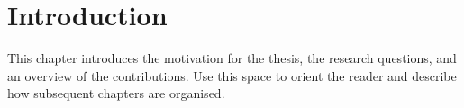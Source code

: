 \chapter{Introduction}
\label{chap:introduction}

This chapter introduces the motivation for the thesis, the research questions, and an overview of the contributions. Use this space to orient the reader and describe how subsequent chapters are organised.
